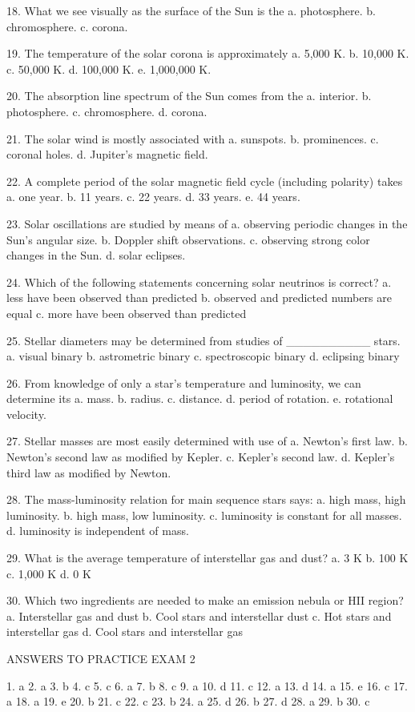  18. What we see visually as the surface of the Sun is the
      a.  photosphere.
      b.  chromosphere.
      c.  corona.
       
 19. The temperature of the solar corona is approximately
      a.  5,000 K.
      b.  10,000 K.
      c.  50,000 K.
      d.  100,000 K.
      e.  1,000,000 K.
       
 20. The absorption line spectrum of the Sun comes from the
      a.  interior.
      b.  photosphere.
      c.  chromosphere.
      d.  corona.
       
 21. The solar wind is mostly associated with
      a.  sunspots.
      b.  prominences.
      c.  coronal holes.
      d.  Jupiter's magnetic field.
       
 22. A complete period of the solar magnetic field cycle (including polarity) takes
      a.  one year.
      b.  11 years.
      c.  22 years.
      d.  33 years.
      e.  44 years.
       
 23. Solar oscillations are studied by means of
      a.  observing periodic changes in the Sun's angular size.
      b.  Doppler shift observations.
      c.  observing strong color changes in the Sun.
      d.  solar eclipses.
       
 24. Which of the following statements concerning solar neutrinos is correct?
      a.  less have been observed than predicted
      b.  observed and predicted numbers are equal
      c.  more have been observed than predicted

 25. Stellar diameters may be determined from studies of __________ stars.
    a. visual binary
    b. astrometric binary
    c. spectroscopic binary
    d. eclipsing binary

 26. From knowledge of only a star's temperature and luminosity, we can determine its
    a. mass.
    b. radius.
    c. distance.
    d. period of rotation.
    e. rotational velocity. 

 27. Stellar masses are most easily determined with use of
    a. Newton's first law.
    b. Newton's second law as modified by Kepler.
    c. Kepler's second law.
    d. Kepler's third law as modified by Newton.

 28. The mass-luminosity relation for main sequence stars says:
    a. high mass, high luminosity.
    b. high mass, low luminosity.
    c. luminosity is constant for all masses.
    d. luminosity is independent of mass.

 29. What is the average temperature of interstellar gas and dust?
    a. 3 K
    b. 100 K
    c. 1,000 K
    d. 0 K

 30. Which two ingredients are needed to make an emission nebula or HII region?
    a.  Interstellar gas and dust
    b. Cool stars and interstellar dust
    c. Hot stars and interstellar gas
    d. Cool stars and interstellar gas


ANSWERS TO PRACTICE EXAM 2

1. a
2. a
3. b
4. c
5. c
6. a
7. b
8. c
9. a
10. d
11. c
12. a
13. d
14. a
15. e
16. c
17. a
18. a
19. e
20. b
21. c
22. c
23. b
24. a
25. d
26. b
27. d
28. a
29. b
30. c

